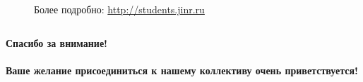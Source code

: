 \documentclass[dvipsnames] {beamer}
\begin{document}
\begin{frame}
\begin{columns}[c]
\begin{block}{}
\begin{figure}[H]
        Более подробно:
        \url{http://students.jinr.ru}
    \end{figure}
    \end{block}
  \end{columns}
\end{frame}


\begin{frame}
  \begin{center}
    \Huge{\bf \centering Спасибо за внимание! \\
      $$ $$ \\
    Ваше желание присоединиться к нашему коллективу очень приветствуется!}
  \end{center}
\end{frame}
\end{document}
